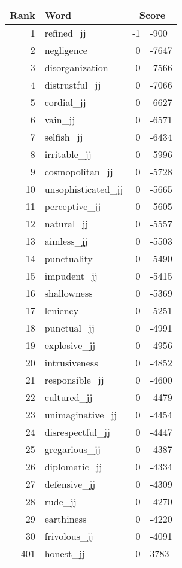\begin{longtable}[!htbp]{| rlr@{.}l |}
    \hline
    \textbf{Rank} & \textbf{Word} & \multicolumn{2}{c|}{\textbf{Score}} \\
    \hline
    \endhead
    1 & refined\_jj & -1 & -900 \\
    2 & negligence & 0 & -7647 \\
    3 & disorganization & 0 & -7566 \\
    4 & distrustful\_jj & 0 & -7066 \\
    5 & cordial\_jj & 0 & -6627 \\
    6 & vain\_jj & 0 & -6571 \\
    7 & selfish\_jj & 0 & -6434 \\
    8 & irritable\_jj & 0 & -5996 \\
    9 & cosmopolitan\_jj & 0 & -5728 \\
    10 & unsophisticated\_jj & 0 & -5665 \\
    11 & perceptive\_jj & 0 & -5605 \\
    12 & natural\_jj & 0 & -5557 \\
    13 & aimless\_jj & 0 & -5503 \\
    14 & punctuality & 0 & -5490 \\
    15 & impudent\_jj & 0 & -5415 \\
    16 & shallowness & 0 & -5369 \\
    17 & leniency & 0 & -5251 \\
    18 & punctual\_jj & 0 & -4991 \\
    19 & explosive\_jj & 0 & -4956 \\
    20 & intrusiveness & 0 & -4852 \\
    21 & responsible\_jj & 0 & -4600 \\
    22 & cultured\_jj & 0 & -4479 \\
    23 & unimaginative\_jj & 0 & -4454 \\
    24 & disrespectful\_jj & 0 & -4447 \\
    25 & gregarious\_jj & 0 & -4387 \\
    26 & diplomatic\_jj & 0 & -4334 \\
    27 & defensive\_jj & 0 & -4309 \\
    28 & rude\_jj & 0 & -4270 \\
    29 & earthiness & 0 & -4220 \\
    30 & frivolous\_jj & 0 & -4091 \\
    401 & honest\_jj & 0 & 3783 \\

\end{longtable}
